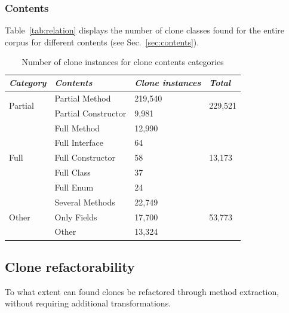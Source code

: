 \documentclass[sigconf,review]{acmart}
\begin{document}
\subsubsection{Contents}
Table~\ref{tab:relation} displays the number of clone classes found for the entire corpus for different contents (see Sec.~\ref{sec:contents}).

\begin{table}[]
\centering
\begin{tabular}{@{}llll@{}}
\toprule
\textit{\textbf{Category}} & \textit{\textbf{Contents}} & \textit{\textbf{Clone instances}} & \textit{\textbf{Total}} \\ \midrule
\multirow{2}{*}{Partial} & Partial Method & 219,540 & \multirow{2}{*}{229,521} \\ \cmidrule(lr){2-3}
 & Partial Constructor & 9,981 &  \\ \midrule
\multirow{5}{*}{Full} & Full Method & 12,990 & \multirow{5}{*}{13,173} \\ \cmidrule(lr){2-3}
 & Full Interface & 64 &  \\ \cmidrule(lr){2-3}
 & Full Constructor & 58 &  \\ \cmidrule(lr){2-3}
 & Full Class & 37 &  \\ \cmidrule(lr){2-3}
 & Full Enum & 24 &  \\ \midrule
\multirow{3}{*}{Other} & Several Methods & 22,749 & \multirow{3}{*}{53,773} \\ \cmidrule(lr){2-3}
 & Only Fields & 17,700 &  \\ \cmidrule(lr){2-3}
 & Other & 13,324 &  \\ \bottomrule
\end{tabular}
\caption{Number of clone instances for clone contents categories}
\label{tab:contents}
\end{table}

\subsection{Clone refactorability}
To what extent can found clones be refactored through method extraction, without requiring additional transformations.
\end{document}
